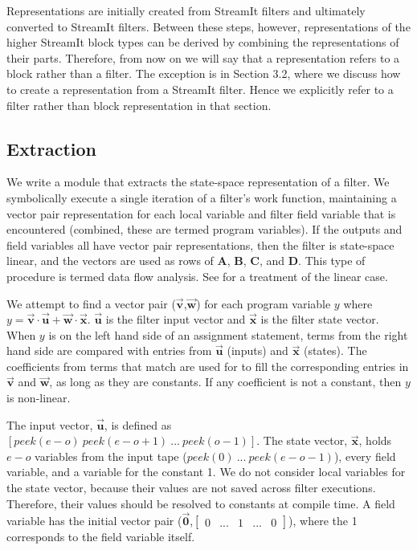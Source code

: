     Representations are initially created from StreamIt filters and
ultimately converted to StreamIt filters. Between these steps,
however, representations of the higher StreamIt block types can be
derived by combining the representations of their parts.
Therefore, from now on we will say that a representation refers to
a block rather than a filter. The exception is in Section 3.2,
where we discuss how to create a representation from a StreamIt
filter. Hence we explicitly refer to a filter rather than block
representation in that section.

\subsection{Extraction}

    We write a module that extracts the state-space representation of
a filter. We symbolically execute a single iteration of a filter's
work function, maintaining a vector pair representation for each
local variable and filter field variable that is encountered
(combined, these are termed program variables). If the outputs and
field variables all have vector pair representations, then the
filter is state-space linear, and the vectors are used as rows of
$\mathbf{A}$, $\mathbf{B}$, $\mathbf{C}$, and $\mathbf{D}$. This
type of procedure is termed data flow analysis. See \cite{Lamb}
for a treatment of the linear case.

    We attempt to find a vector pair
($\vec{\mathbf{v}}$,$\vec{\mathbf{w}}$) for each program variable
$y$ where $y = \vec{\mathbf{v}} \cdot \vec{\mathbf{u}} +
\vec{\mathbf{w}} \cdot \vec{\mathbf{x}}$. $\vec{\mathbf{u}}$ is
the filter input vector and $\vec{\mathbf{x}}$ is the filter state
vector. When $y$ is on the left hand side of an assignment
statement, terms from the right hand side are compared with
entries from $\vec{\mathbf{u}}$ (inputs) and $\vec{\mathbf{x}}$
(states). The coefficients from terms that match are used for to
fill the corresponding entries in $\vec{\mathbf{v}}$ and
$\vec{\mathbf{w}}$, as long as they are constants. If any
coefficient is not a constant, then $y$ is non-linear.

    The input vector, $\vec{\mathbf{u}}$, is defined as $[peek(e-o)
~peek(e-o+1) ~... ~peek(o-1)]$. The state vector,
$\vec{\mathbf{x}}$, holds $e-o$ variables from the input tape
($peek(0) ~... ~peek(e-o-1)$), every field variable, and a
variable for the constant 1. We do not consider local variables
for the state vector, because their values are not saved across
filter executions. Therefore, their values should be resolved to
constants at compile time. A field variable has the initial vector
pair ($\vec{\mathbf{0}}$,$\left [
\begin{array} {ccccc} 0 & ... & 1 & ... & 0 \end{array} \right
]$), where the 1 corresponds to the field variable itself.

